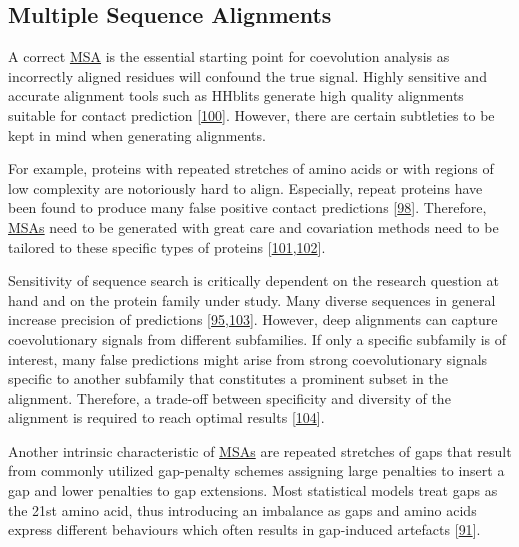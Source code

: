 \documentclass[12pt,a4paper,twoside]{book}
\theoremstyle{definition}
\theoremstyle{definition}
\theoremstyle{remark}
\begin{document}
\subsection*{Multiple Sequence
Alignments}\label{multiple-sequence-alignments}

A correct \protect\hyperlink{abbrev}{MSA} is the essential starting
point for coevolution analysis as incorrectly aligned residues will
confound the true signal. Highly sensitive and accurate alignment tools
such as HHblits generate high quality alignments suitable for contact
prediction {[}\protect\hyperlink{ref-Remmert2012}{100}{]}. However,
there are certain subtleties to be kept in mind when generating
alignments.

For example, proteins with repeated stretches of amino acids or with
regions of low complexity are notoriously hard to align. Especially,
repeat proteins have been found to produce many false positive contact
predictions {[}\protect\hyperlink{ref-Anishchenko2017}{98}{]}.
Therefore, \protect\hyperlink{abbrev}{MSAs} need to be generated with
great care and covariation methods need to be tailored to these specific
types of proteins
{[}\protect\hyperlink{ref-Espada2014}{101},\protect\hyperlink{ref-Toth-Petroczy2016}{102}{]}.

Sensitivity of sequence search is critically dependent on the research
question at hand and on the protein family under study. Many diverse
sequences in general increase precision of predictions
{[}\protect\hyperlink{ref-Ashkenazy2009}{95},\protect\hyperlink{ref-Avila-Herrera2015a}{103}{]}.
However, deep alignments can capture coevolutionary signals from
different subfamilies. If only a specific subfamily is of interest, many
false predictions might arise from strong coevolutionary signals
specific to another subfamily that constitutes a prominent subset in the
alignment. Therefore, a trade-off between specificity and diversity of
the alignment is required to reach optimal results
{[}\protect\hyperlink{ref-Hopf2012}{104}{]}.

Another intrinsic characteristic of \protect\hyperlink{abbrev}{MSAs} are
repeated stretches of gaps that result from commonly utilized
gap-penalty schemes assigning large penalties to insert a gap and lower
penalties to gap extensions. Most statistical models treat gaps as the
21st amino acid, thus introducing an imbalance as gaps and amino acids
express different behaviours which often results in gap-induced
artefacts {[}\protect\hyperlink{ref-Feinauer2014}{91}{]}.
\end{document}
